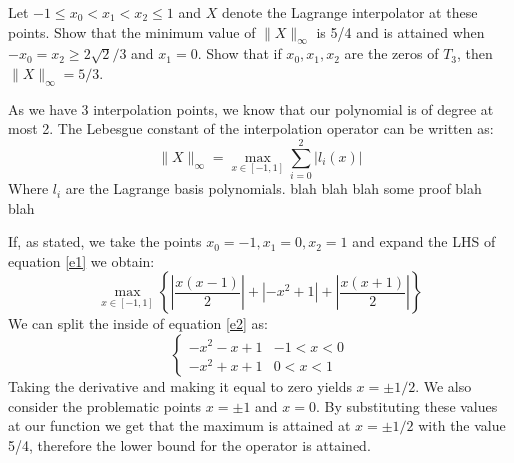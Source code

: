 \begin{problem}
Let $-1 \leq x_0 < x_1 < x_2 \leq 1$ and $X$ denote the Lagrange
interpolator at these points. Show that the minimum value of
$\lVert X \rVert_\infty$ is 5/4 and is attained when $-x_0 = x_2 \geq 2
\sqrt{2}/3$ and $x_1 = 0$. Show that if $x_0 , x_1 , x_2$ are
the zeros of $T_3$, then $\lVert X \rVert_\infty = 5/3$.
\end{problem}


\begin{solution}  
As we have 3 interpolation points, we know that our polynomial is of degree at most 2. The Lebesgue constant of the interpolation operator can be written as:
\begin{equation}
\lVert X \rVert_{\infty} = \max_{x\in [-1,1]} \sum_{i=0}^2 \lvert l_i(x) \rvert
\label{e1}
\end{equation}
Where $l_i$ are the Lagrange basis polynomials. blah blah blah some proof blah blah

If, as stated, we take the points $x_0 = -1, x_1 = 0, x_2 = 1$ and expand the LHS of equation \ref{e1} we obtain:
\begin{equation}
\max_{x \in [-1,1]} \left \{ \left | \frac{x(x-1)}{2} \right | + \left | -x^2+1 \right | + \left | \frac{x(x+1)}{2} \right | \right \}
\label{e2}
\end{equation}
We can split the inside of equation \ref{e2} as:
\[ \begin{cases} 
      -x^2-x+1  &-1< x< 0 \\
      -x^2+x+1  &0< x<1 
   \end{cases}
\]
Taking the derivative and making it equal to zero yields $x = \pm 1/2$. We also consider the problematic points $x = \pm 1$ and $x = 0$. By substituting these values at our function we get that the maximum is attained at $x=\pm 1/2$ with the value 5/4, therefore the lower bound for the operator is attained.


\end{solution}
